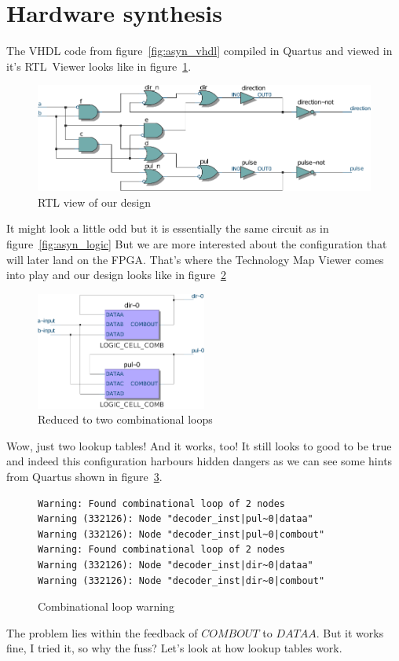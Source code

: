 \documentclass[a4paper]{article}
\begin{document}
\section{Hardware synthesis}
The VHDL code from figure~\ref{fig:asyn_vhdl} compiled in Quartus and viewed in it's RTL~Viewer looks like in figure~\ref{fig:asyn_rtl}.
\begin{figure}[h]
\centering
\includegraphics[width=\textwidth]{asynchronous_quadrature_decoder_quartus_rtl.pdf}
\caption{RTL view of our design}
\label{fig:asyn_rtl}
\end{figure}
It might look a little odd but it is essentially the same circuit as in figure~\ref{fig:asyn_logic}
But we are more interested about the configuration that will later land on the FPGA.
That's where the Technology Map Viewer comes into play and our design looks like in figure~\ref{fig:asyn_map}
\begin{figure}[h]
\centering
\includegraphics[width=0.5\textwidth]{asynchronous_quadrature_decoder_quartus_map.pdf}
\caption{Reduced to two combinational loops}
\label{fig:asyn_map}
\end{figure}
Wow, just two lookup tables! And it works, too!
It still looks to good to be true and indeed this configuration harbours hidden dangers as we can see some hints from Quartus shown in figure~\ref{fig:warning}.
\begin{figure}[h]
\centering
\begin{BVerbatim}
Warning: Found combinational loop of 2 nodes
Warning (332126): Node "decoder_inst|pul~0|dataa"
Warning (332126): Node "decoder_inst|pul~0|combout"
Warning: Found combinational loop of 2 nodes
Warning (332126): Node "decoder_inst|dir~0|dataa"
Warning (332126): Node "decoder_inst|dir~0|combout"
\end{BVerbatim}
\caption{Combinational loop warning}
\label{fig:warning}
\end{figure}
The problem lies within the feedback of $COMBOUT$ to $DATAA$.
But it works fine, I tried it, so why the fuss? Let's look at how lookup tables work.
\newpage
\end{document}
